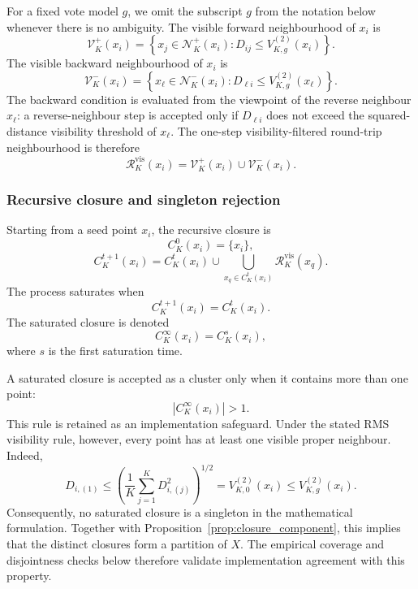 \documentclass[review,12pt]{elsarticle}
\newcommand{\calN}{\mathcal{N}}
\newcommand{\calR}{\mathcal{R}}
\newcommand{\calV}{\mathcal{V}}
\begin{document}
For a fixed vote model $g$, we omit the subscript $g$ from the notation
below whenever there is no ambiguity. The visible forward neighbourhood of $x_i$ is
\begin{equation}
\calV_K^+(x_i)=
\left\{
x_j\in\calN_K^+(x_i):
D_{ij}\leq V_{K,g}^{(2)}(x_i)
\right\}.
\label{eq:visible_forward}
\end{equation}
The visible backward neighbourhood of $x_i$ is
\begin{equation}
\calV_K^-(x_i)=
\left\{
x_\ell\in\calN_K^-(x_i):
D_{\ell i}\leq V_{K,g}^{(2)}(x_\ell)
\right\}.
\label{eq:visible_backward}
\end{equation}
The backward condition is evaluated from the viewpoint of the reverse
neighbour $x_\ell$: a reverse-neighbour step is accepted only if
$D_{\ell i}$ does not exceed the squared-distance visibility threshold of
$x_\ell$. The one-step visibility-filtered round-trip neighbourhood is
therefore
\begin{equation}
\calR_K^{\mathrm{vis}}(x_i)
=
\calV_K^+(x_i)\cup\calV_K^-(x_i).
\label{eq:visible_roundtrip}
\end{equation}


\subsubsection{Recursive closure and singleton rejection}

Starting from a seed point $x_i$, the recursive closure is
\begin{equation}
C_K^0(x_i)=\{x_i\},
\end{equation}
\begin{equation}
C_K^{t+1}(x_i)
=
C_K^t(x_i)\cup
\bigcup_{x_q\in C_K^t(x_i)}
\calR_K^{\mathrm{vis}}(x_q).
\label{eq:visibility_closure}
\end{equation}
The process saturates when
\begin{equation}
C_K^{t+1}(x_i)=C_K^t(x_i).
\end{equation}
The saturated closure is denoted
\begin{equation}
C_K^\infty(x_i)=C_K^s(x_i),
\end{equation}
where $s$ is the first saturation time.

A saturated closure is accepted as a cluster only when it contains more than
one point:
\begin{equation}
|C_K^\infty(x_i)|>1.
\label{eq:singleton_rejection}
\end{equation}
This rule is retained as an implementation safeguard. Under the stated
RMS visibility rule, however, every point has at least one visible proper
neighbour. Indeed,
\begin{equation}
D_{i,(1)}\leq
\left(\frac{1}{K}\sum_{j=1}^{K}D_{i,(j)}^2\right)^{1/2}
=V_{K,0}^{(2)}(x_i)\leq V_{K,g}^{(2)}(x_i).
\label{eq:nonempty_visible_neighbourhood}
\end{equation}
Consequently, no saturated closure is a singleton in the mathematical
formulation. Together with Proposition~\ref{prop:closure_component}, this
implies that the distinct closures form a partition of $X$. The empirical
coverage and disjointness checks below therefore validate implementation
agreement with this property.
\end{document}
